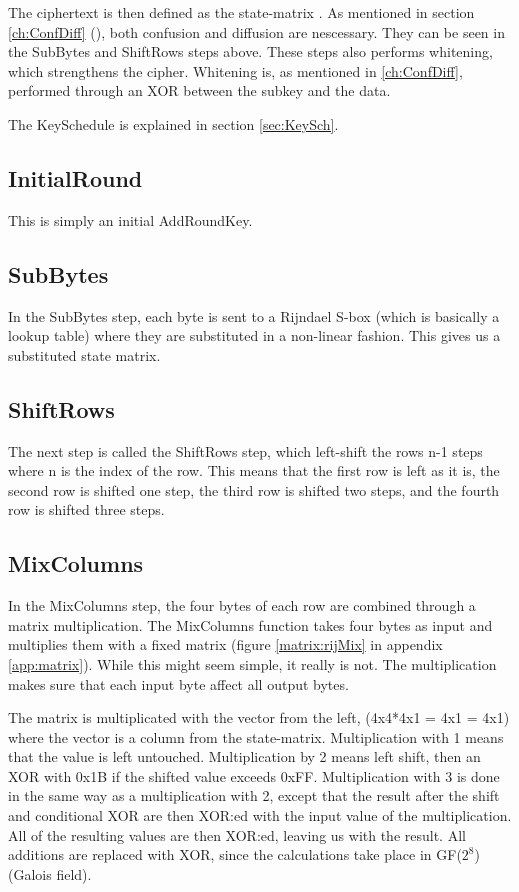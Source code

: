 The ciphertext is then defined as the state-matrix \citep[p. 103]{Stinson:2006}. 
As mentioned in section \ref{ch:ConfDiff} (), both 
confusion and diffusion are nescessary. They can be seen in the SubBytes and 
ShiftRows steps above. These steps also performs whitening, which strengthens the cipher. Whitening is, as mentioned in \ref{ch:ConfDiff}, performed through an 
XOR between the subkey and the data.

The KeySchedule is explained in section \ref{sec:KeySch}.

\subsection{InitialRound}
This is simply an initial AddRoundKey.

\subsection{SubBytes}
In the SubBytes step, each byte is sent to a Rijndael S-box (which is basically
 a lookup table) where they are substituted in a non-linear fashion. This gives 
us a substituted state matrix.

\subsection{ShiftRows}
The next step is called the ShiftRows step, which left-shift the rows n-1 
steps where n is the index of the row. This means that the first row is left 
as it is, the second row is shifted one step, the third row is shifted two 
steps, and the fourth row is shifted three steps.

\subsection{MixColumns}
In the MixColumns step, the four bytes of each row are combined through a matrix 
multiplication. The MixColumns function takes four bytes as input and multiplies 
them with a fixed matrix (figure \ref{matrix:rijMix} in appendix 
\ref{app:matrix}). While this might seem simple, it really is not. The 
multiplication makes sure that each input byte affect all output bytes.
\citep{Angelfire}

The matrix is multiplicated with the vector from the left, (4x4*4x1 = 
4x1 = 4x1) where the vector is a column from the state-matrix. 
Multiplication with 1 means that the value is left untouched. Multiplication by 
2 means left shift, then an XOR with 0x1B if the shifted value exceeds 0xFF. 
Multiplication with 3 is done in the same way as a multiplication with 2, except 
that the result after the shift and conditional XOR are then XOR:ed with the 
input value of the multiplication. All of the resulting values are then XOR:ed, 
leaving us with the result. All additions are replaced with XOR, since the 
calculations take place in GF(\(2^8\)) (Galois field).

